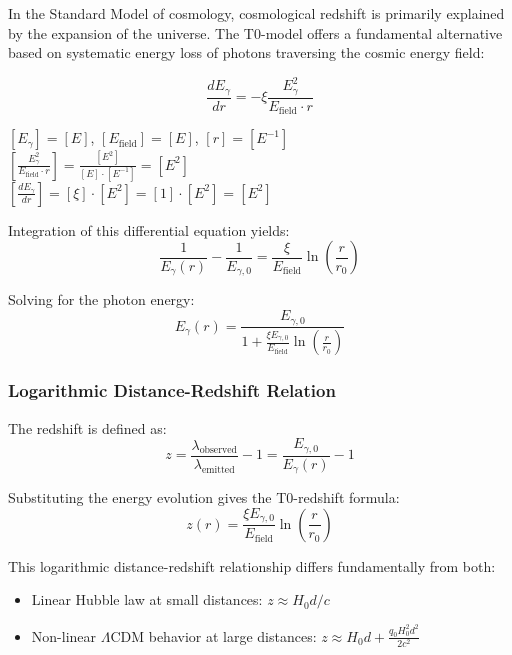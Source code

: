 \documentclass[12pt,a4paper]{article}
\theoremstyle{definition}
\begin{document}
In the Standard Model of cosmology, cosmological redshift is primarily explained by the expansion of the universe. The T0-model offers a fundamental alternative based on systematic energy loss of photons traversing the cosmic energy field:

\begin{equation}
	\boxed{\frac{dE_\gamma}{dr} = -\xi \frac{E_\gamma^2}{E_{\text{field}} \cdot r}}
\end{equation}

\begin{einheitencheck}
	$[E_\gamma] = [E]$, $[E_{\text{field}}] = [E]$, $[r] = [E^{-1}]$ \\
	$[\frac{E_\gamma^2}{E_{\text{field}} \cdot r}] = \frac{[E^2]}{[E] \cdot [E^{-1}]} = [E^2]$ \\
	$[\frac{dE_\gamma}{dr}] = [\xi] \cdot [E^2] = [1] \cdot [E^2] = [E^2]$ \checkmark
\end{einheitencheck}

Integration of this differential equation yields:
\begin{equation}
	\frac{1}{E_\gamma(r)} - \frac{1}{E_{\gamma,0}} = \frac{\xi}{E_{\text{field}}} \ln\left(\frac{r}{r_0}\right)
\end{equation}

Solving for the photon energy:
\begin{equation}
	E_\gamma(r) = \frac{E_{\gamma,0}}{1 + \frac{\xi E_{\gamma,0}}{E_{\text{field}}} \ln\left(\frac{r}{r_0}\right)}
\end{equation}

\subsubsection{Logarithmic Distance-Redshift Relation}

The redshift is defined as:
\begin{equation}
	z = \frac{\lambda_{\text{observed}}}{\lambda_{\text{emitted}}} - 1 = \frac{E_{\gamma,0}}{E_\gamma(r)} - 1
\end{equation}

Substituting the energy evolution gives the T0-redshift formula:
\begin{equation}
	\boxed{z(r) = \frac{\xi E_{\gamma,0}}{E_{\text{field}}} \ln\left(\frac{r}{r_0}\right)}
\end{equation}

This logarithmic distance-redshift relationship differs fundamentally from both:
\begin{itemize}
	\item Linear Hubble law at small distances: $z \approx H_0 d/c$
	\item Non-linear $\Lambda$CDM behavior at large distances: $z \approx H_0 d + \frac{q_0 H_0^2 d^2}{2c^2}$
\end{itemize}
\end{document}
